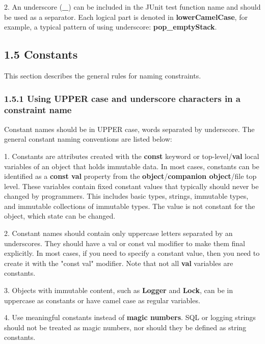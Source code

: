 {{{{{{{{2.	An underscore (\textbf{_}) can be included in the JUnit test function name and should be used as a separator. Each logical part is denoted in \textbf{lowerCamelCase}, for example, a typical pattern of using underscore: \textbf{pop_emptyStack}.

\subsection*{\textbf{1.5 Constants}}

\label{sec:1.5}

This section describes the general rules for naming constraints.

\subsubsection*{\textbf{1.5.1 Using UPPER case and underscore characters in a constraint name}}
\leavevmode\newline

\label{sec:1.5.1}

Constant names should be in UPPER case, words separated by underscore. The general constant naming conventions are listed below:

1. Constants are attributes created with the \textbf{const} keyword or top-level/\textbf{val} local variables of an object that holds immutable data. In most cases, constants can be identified as a \textbf{const val} property from the \textbf{object}/\textbf{companion object}/file top level. These variables contain fixed constant values that typically should never be changed by programmers. This includes basic types, strings, immutable types, and immutable collections of immutable types. The value is not constant for the object, which state can be changed.

2. Constant names should contain only uppercase letters separated by an underscores. They should have a val or const val modifier to make them final explicitly. In most cases, if you need to specify a constant value, then you need to create it with the "const val" modifier. Note that not all \textbf{val} variables are constants.

3. Objects with immutable content, such as \textbf{Logger} and \textbf{Lock}, can be in uppercase as constants or have camel case as regular variables.

4. Use meaningful constants instead of \textbf{magic numbers}. SQL or logging strings should not be treated as magic numbers, nor should they be defined as string constants.

}}}}}}}}
